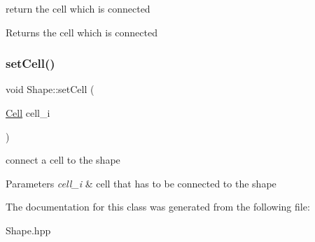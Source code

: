 return the cell which is connected \begin{DoxyReturn}{Returns}
the cell which is connected 
\end{DoxyReturn}
\mbox{\label{class_shape_a9f07382e9173d32feaa737fe57560c9c}} 
\subsubsection{\texorpdfstring{set\+Cell()}{setCell()}}
{\footnotesize\ttfamily void Shape\+::set\+Cell (\begin{DoxyParamCaption}\item[{\mbox{\hyperlink{class_cell}{Cell}}}]{cell\+\_\+i }\end{DoxyParamCaption})}

connect a cell to the shape 
\begin{DoxyParams}{Parameters}
{\em cell\+\_\+i} & cell that has to be connected to the shape \\
\hline
\end{DoxyParams}


The documentation for this class was generated from the following file\+:\begin{DoxyCompactItemize}
\item 
Shape.\+hpp\end{DoxyCompactItemize}
